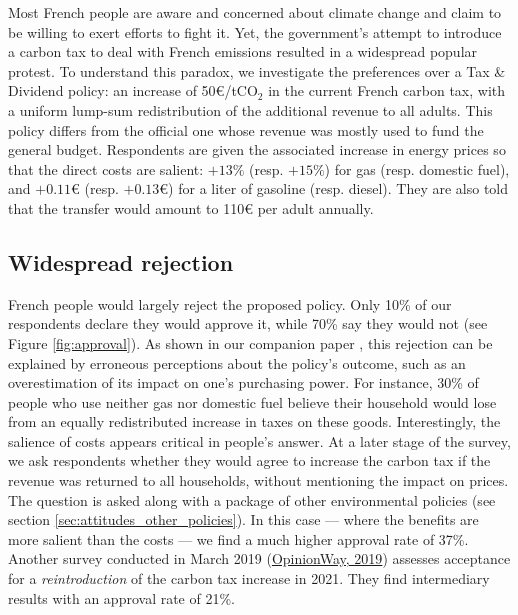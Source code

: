 \documentclass[english,5p,authoryear]{elsarticle}
\begin{document}
Most French people are aware and concerned about climate change and claim to be willing to exert efforts to fight it. Yet, the government's attempt to introduce a carbon tax to deal with French emissions resulted in a widespread popular protest. To understand this paradox, we investigate the preferences over a Tax \& Dividend policy: an increase of 50\euro{}/tCO$_2$ in the current French carbon tax, with a uniform lump-sum redistribution of the additional revenue to all adults. This policy differs from the official one whose revenue was mostly used to fund the general budget. Respondents are given the associated increase in energy prices so that the direct costs are salient: $+13\%$ (resp. $+15\%$) for gas (resp. domestic fuel), and $+0.11$\euro{} (resp. $+0.13$\euro{}) for a liter of gasoline (resp. diesel). They are also told that the transfer would amount to 110\euro{} per adult annually. %

    \subsection{Widespread rejection}

French people would largely reject the proposed policy. Only 10\% of our respondents declare they would approve it, while 70\% say they would not (see Figure \ref{fig:approval}). As shown in our companion paper \citep{douenne_can_2019}, this rejection can be explained by erroneous perceptions about the policy's outcome, such as an overestimation of its impact on one's purchasing power. For instance, 30\% of people who use neither gas nor domestic fuel believe their household would lose from an equally redistributed increase in taxes on these goods. Interestingly, the salience of costs appears critical in people's answer. At a later stage of the survey, we ask respondents whether they would agree to increase the carbon tax if the revenue was returned to all households, without mentioning the impact on prices. The question is asked along with a package of other environmental policies (see section \ref{sec:attitudes_other_policies}). In this case --- where the benefits are more salient than the costs --- we find a much higher approval rate of 37\%. Another survey conducted in March 2019 (\href{https://drive.google.com/file/d/1ne1nUsJJqY1PYFOs9dH9uK6mLw39R1QY/view}{OpinionWay, 2019}) assesses acceptance for a \textit{reintroduction} of the carbon tax increase in 2021. They find intermediary results with an approval rate of 21\%. %
\end{document}
